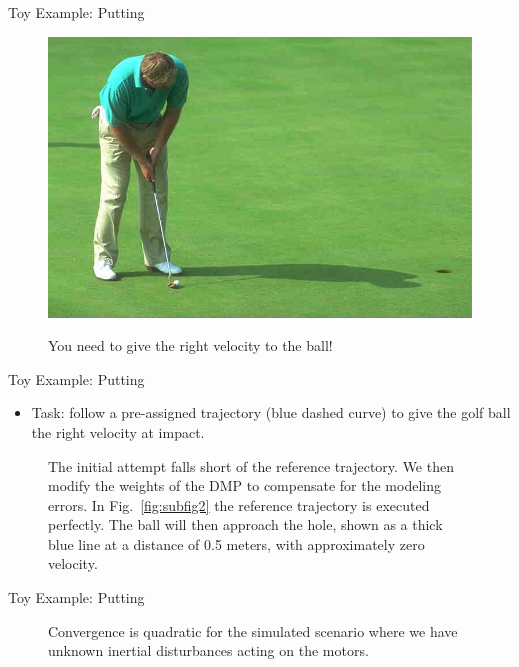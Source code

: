\documentclass[handout]{beamer}
\begin{document}
%
\begin{frame}{Toy Example: Putting}
\begin{figure}[b!]
\centering
\includegraphics[scale=0.4]{putting.jpg}			
\label{putting}
\caption{You need to give the right velocity to the ball!}
\end{figure}
\end{frame}
%
\begin{frame}{Toy Example: Putting}
\begin{itemize}
\item Task: follow a pre-assigned trajectory (blue dashed curve) to give the golf ball the right velocity at impact.
\end{itemize}
\begin{figure}[ht]
\centering
{}
\caption{The initial attempt falls short of the reference trajectory. We then modify the weights of the DMP to compensate for the modeling errors. In Fig.~\ref{fig:subfig2} the reference trajectory is executed perfectly. The ball will then approach the hole, shown as a thick blue line at a distance of 0.5 meters, with approximately zero velocity.} 
\label{putting1} 
\end{figure}
\end{frame}
%
\begin{frame}{Toy Example: Putting}
\begin{figure}
\centering
\newlength\figureheight 
\newlength\figurewidth 
\setlength\figureheight{6cm}  
\setlength\figurewidth{6cm} 
\scalebox{0.8}{}
\caption{Convergence is quadratic for the simulated scenario where we have unknown inertial disturbances acting on the motors.}
\label{wILCTrajectoryPutting}
\end{figure}
\end{frame}
\end{document}
